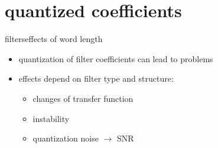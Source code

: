     \section{quantized coefficients}
		\begin{frame}{filters}{effects of word length}
            \vspace{-3mm}
            \begin{itemize}
                \item   quantization of filter coefficients can lead to problems
                \item   effects depend on filter type and structure:
                    \begin{itemize}
                        \item   changes of transfer function
                        \item   instability
                        \item   quantization noise $\rightarrow$ SNR
                    \end{itemize}
            \end{itemize}
			\vspace{-5mm}
\end{frame}
